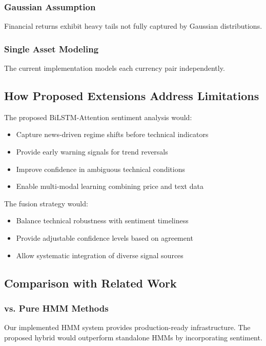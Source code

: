 \documentclass[conference]{IEEEtran}
\begin{document}
\subsubsection{Gaussian Assumption}
Financial returns exhibit heavy tails not fully captured by Gaussian distributions.

\subsubsection{Single Asset Modeling}
The current implementation models each currency pair independently.

\subsection{How Proposed Extensions Address Limitations}

The proposed BiLSTM-Attention sentiment analysis would:
\begin{itemize}
\item Capture news-driven regime shifts before technical indicators
\item Provide early warning signals for trend reversals
\item Improve confidence in ambiguous technical conditions
\item Enable multi-modal learning combining price and text data
\end{itemize}

The fusion strategy would:
\begin{itemize}
\item Balance technical robustness with sentiment timeliness
\item Provide adjustable confidence levels based on agreement
\item Allow systematic integration of diverse signal sources
\end{itemize}

\subsection{Comparison with Related Work}

\subsubsection{vs. Pure HMM Methods}
Our implemented HMM system provides production-ready infrastructure. The proposed hybrid would outperform standalone HMMs by incorporating sentiment.
\end{document}
